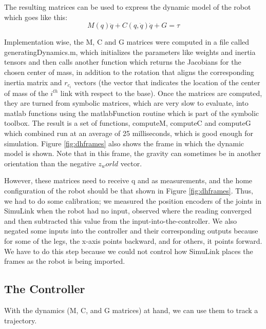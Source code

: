 The resulting matrices can be used to express the dynamic model of the robot which goes like this:
$$
M(q) \ddot{q} + C(q, \dot{q}) \dot{q} + G = \tau
$$

Implementation wise, the M, C and G matrices were computed in a file called generatingDynamics.m, which initializes the parameters like weights and inertia tensors and then calls another function which returns the Jacobians for the chosen center of mass, in addition to the rotation that aligns the corresponding inertia matrix and $r_{c_i}$ vectors (the vector that indicates the location of the center of mass of the $i^{th}$ link with respect to the base). Once the matrices are computed, they are turned from symbolic matrices, which are very slow to evaluate, into matlab functions using the matlabFunction routine which is part of the symbolic toolbox. The result is a set of functions, computeM, computeC and computeG which combined run at an average of 25 milliseconds, which is good enough for simulation. Figure \ref{fig:dhframes} also shows the frame in which the dynamic model is shown. Note that in this frame, the gravity can sometimes be in another orientation than the negative $z_world$ vector.

However, these matrices need to receive q and  as measurements, and the home configuration of the robot should be that shown in Figure \ref{fig:dhframes}. Thus, we had to do some calibration; we measured the position encoders of the joints in SimuLink when the robot had no input, observed where the reading converged and then subtracted this value from the input-into-the-controller. We also negated some inputs into the controller and their corresponding outputs because for some of the legs, the x-axis points backward, and for others, it points forward. We have to do this step because we could not control how SimuLink places the frames as the robot is being imported.

\subsection{The Controller}
With the dynamics (M, C, and G matrices) at hand, we can use them to track a trajectory.


